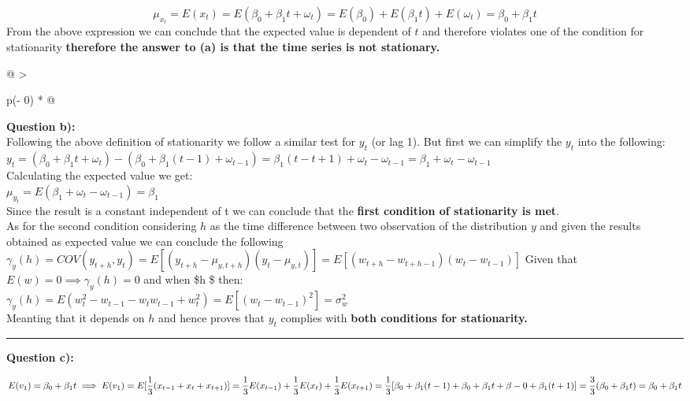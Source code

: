 \documentclass[
]{article}
\begin{document}
\[\mu_{x_t} = E(x_t) = E(\beta_0 + \beta_1t + \omega_t) = E(\beta_0) + E(\beta_1t)+E(\omega_t) = \beta_0 + \beta_1t \]
From the above expression we can conclude that the expected value is
dependent of \(t\) and therefore violates one of the condition for
stationarity \textbf{therefore the answer to (a) is that the time series
is not stationary.}

\begin{longtable}[]{@{}
  >{\raggedright\arraybackslash}p{(\columnwidth - 0\tabcolsep) * }@{}}
\toprule
\endhead
\textbf{Question b):} \\
Following the above definition of stationarity we follow a similar test
for \(y_t\) (or lag 1). But first we can simplify the \(y_t\) into the
following: \\
\(y_t = (\beta_0 + \beta_1t + \omega_t) - (\beta_0 + \beta_1(t-1)+ \omega_{t-1}) = \beta_1(t - t + 1) + \omega_t - \omega_{t-1} = \beta_1 + \omega_t - \omega_{t-1}\) \\
Calculating the expected value we get: \\
\(\mu_{y_t} = E(\beta_1 + \omega_t - \omega_{t-1}) = \beta_1\) \\
Since the result is a constant independent of t we can conclude that the
\textbf{first condition of stationarity is met}. \\
As for the second condition considering \(h\) as the time difference
between two observation of the distribution \(y\) and given the results
obtained as expected value we can conclude the following \\
\(\gamma_y(h) = COV(y_{t+h}, y_t) = E[(y_{t+h} - \mu_{y,t+h})(y_t-\mu_{y,t})] = E[(w_{t+h}-w_{t+h-1})(w_t-w_{t-1})]\)
Given that \(E(w) = 0 \implies \gamma_y(h) = 0\) and when \$h  \$
then: \\
\(\gamma_y(h) = E(w_t^2 - w_{t-1} - w_tw_{t-1}+w_t^2) = E[(w_t-w_{t-1})^2] = \sigma_w^2\) \\
Meanting that it depends on \(h\) and hence proves that \(y_t\) complies
with \textbf{both conditions for stationarity.} \\
\bottomrule
\end{longtable}

\begin{center}\rule{0.5\linewidth}{0.5pt}\end{center}

\textbf{Question c):}

\[E(v_1) = \beta_0 + \beta_1t \implies E(v_1) = E[\frac{1}{3}(x_{t-1} + x_t + x_{t+1})] = \frac{1}{3}E(x_{t-1}) + \frac{1}{3}E(x_t) + \frac{1}{3}E(x_{t+1}) = \\ \frac{1}{3}[\beta_0 + \beta_1(t-1)+\beta_0+\beta_1t+\beta-0+\beta_1(t+1)] = \frac{3}{3}(\beta_0 + \beta_1t) = \beta_0 + \beta_1t\]
\end{document}
